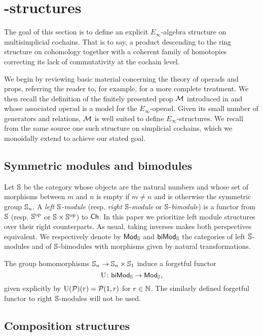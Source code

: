 
\section{\pdfEinfty-structures} \label{s:operads and props}

The goal of this section is to define an explicit $E_\infty$-algebra structure on multisimplicial cochains.
That is to say, a product descending to the ring structure on cohomology together with a coherent family of homotopies correcting its lack of commutativity at the cochain level.

We begin by reviewing basic material concerning the theory of operads and props, referring the reader to, for example, \cite{markl2008props} for a more complete treatment.
We then recall the definition of the finitely presented prop $\M$ introduced in \cite{medina2020prop1} and whose associated operad is a model for the $E_\infty$-operad.
Given its small number of generators and relations, $\M$ is well suited to define $E_\infty$-structures.
We recall from the same source one such structure on simplicial cochains, which we monoidally extend to achieve our stated goal.

\subsection{Symmetric modules and bimodules}

Let $\S$ be the category whose objects are the natural numbers and whose set of morphisms between $m$ and $n$ is empty if $m \neq n$ and is otherwise the symmetric group $\S_n$.
A \textit{left $\S$-module} (resp. \textit{right} $\S$-\textit{module} or $\S$-\textit{bimodule}) is a functor from $\S$ (resp. $\S^\op$ or $\S \times \S^\op$) to $\Ch$.
In this paper we prioritize left module structures over their right counterparts.
As usual, taking inverses makes both perspectives equivalent.
We respectively denote by $\Smod$ and $\Sbimod$ the categories of left $\S$-modules and of $\S$-bimodules with morphisms given by natural transformations.

The group homomorphisms $\S_n \to \S_n \times \S_1$ induce a forgetful functor
\[
\forget \colon \Sbimod \to \Smod,
\]
given explicitly by $\forget(\cP)(r) = \cP(1, r)$ for $r \in \N$.
The similarly defined forgetful functor to right $\S$-modules will not be used.

\subsection{Composition structures}

